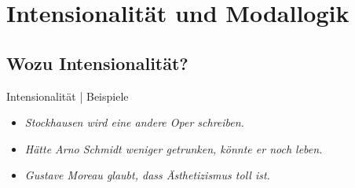 
\section{Intensionalität und Modallogik}

\subsection{Wozu Intensionalität?}

\begin{frame}
  {Intensionalität | Beispiele}
  \onslide<+->
  \begin{itemize}[<+->]
    \item \textit{Stockhausen \alert{wird} eine andere Oper schreiben.}
    \item \textit{\alert{Hätte} Arno Schmidt weniger getrunken, \alert{könnte} er noch leben.}
    \item \textit{Gustave Moreau \alert{glaubt}, dass Ästhetizismus toll ist.}
  \end{itemize}
\end{frame}

